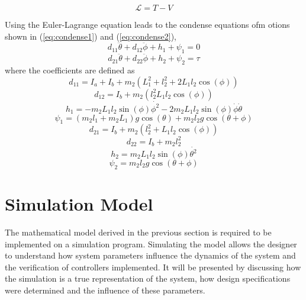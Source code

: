 \begin{equation} \label{eq:euler_lagrane}
\mathcal{L}=T-V
\end{equation}

Using the Euler-Lagrange equation leads to the condense equations ofm otions shown in (\ref{eq:condense1}) and (\ref{eq:condense2}),
\begin{equation} \label{eq:condense1}
d_{11}\ddot{\theta}+d_{12}\ddot{\phi} + h_{1} + \psi_{1} = 0
\end{equation}
\begin{equation} \label{eq:condense2}
d_{21}\ddot{\theta} + d_{22}\ddot{\phi} + h_{2} + \psi_{2} = \tau
\end{equation}
where the coefficients are defined as
\begin{equation} \label{eq:d11}
d_{11} = I_{a} + I_{b} + m_{2}(L_{1}^2 + l_{2}^2+2L_{1}l_{2}\cos(\phi))
\end{equation}
\begin{equation} \label{eq:d12}
d_{12} = I_{b} +m_{2}(l_{2}^2 L_{1}l_{2}\cos(\phi))
\end{equation}
\begin{equation} \label{eq:h1}
h_{1} = -m_{2}L_{1}l_{2}\sin(\phi)\dot{\phi^2}-2m_{2}L_{1}l_{2}\sin(\phi)\dot{\phi}\dot{\theta}
\end{equation}
\begin{equation} \label{eq:psi1}
\psi_{1} = (m_{2}l_{1}+m_{2}L_{1})g\cos(\theta) + m_{2}l_{2}g\cos(\theta+\phi)
\end{equation}
\begin{equation} \label{eq:d21}
d_{21}= I_{b}+m_{2}(l_{2}^2+L_{1}l_{2}\cos(\phi))
\end{equation}
\begin{equation} \label{eq:d22}
d_{22}= I_{b}+ m_{2}l_{2}^2
\end{equation}
\begin{equation} \label{eq:h2}
h_{2}= m_{2}L_{1}l_{2}\sin(\phi)\dot{\theta^2}
\end{equation}
\begin{equation} \label{eq:psi2}
\psi_{2}= m_{2}l_{2}g\cos(\theta+\phi)
\end{equation}

\section{Simulation Model}
The mathematical model derived in the previous section is required to be implemented on a simulation program. Simulating the model allows the designer to understand how system parameters influence the dynamics of the system and the verification of controllers implemented. It will be presented by discussing how the simulation is a true representation of the system, how design specifications were determined and the influence of these parameters.\\

